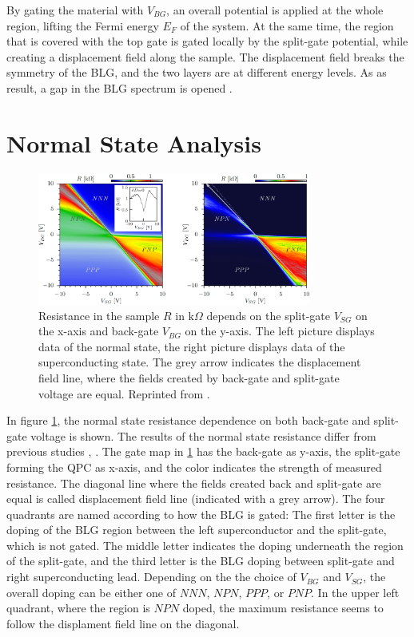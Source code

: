 By gating the material with $V_{BG}$, an overall potential is applied at the whole region, lifting the Fermi energy $E_F$ of the system. At the same time, the region that is covered with the top gate is gated locally by the split-gate potential, while creating a displacement field along the sample. The displacement field breaks the symmetry of the BLG, and the two layers are at different energy levels. As as result, a gap in the BLG spectrum is opened \cite{McCann2006}. 

\section{Normal State Analysis}\label{sec:exp-normal-state}
\begin{figure}
\centering
\includegraphics[width=0.8\textwidth]{figure/experiment/resistance-map-edit}
\caption{Resistance in the sample $R$ in $\text{k}\Omega$ depends on the split-gate $V_{SG}$ on the x-axis and back-gate $V_{BG}$ on the y-axis. The left picture displays data of the normal state, the right picture displays data of the superconducting state. The grey arrow indicates the displacement field line, where the fields created by back-gate and split-gate voltage are equal. Reprinted from \cite{Kraft2017}.}\label{fig:gate-map}
\end{figure}
In figure \ref{fig:gate-map}, the normal state resistance dependence on both back-gate and split-gate voltage is shown. The results of the normal state resistance differ from previous studies \cite{Oostinga2008}, \cite{Taychatanapat2010}. The gate map in \ref{fig:gate-map} has the back-gate as y-axis, the split-gate forming the QPC as x-axis, and the color indicates the strength of measured resistance. The diagonal line where the fields created back and split-gate are equal is called displacement field line (indicated with a grey arrow). The four quadrants are named according to how the BLG is gated: The first letter is the doping of the BLG region between the left superconductor and the split-gate, which is not gated. The middle letter indicates the doping underneath the region of the split-gate, and the third letter is the BLG doping between split-gate and right superconducting lead. Depending on the the choice of $V_{BG}$ and $V_{SG}$, the overall doping can be either one of $NNN$, $NPN$, $PPP$, or $PNP$. In the upper left quadrant, where the region is $NPN$ doped, the maximum resistance seems to follow the displament field line on the diagonal.

